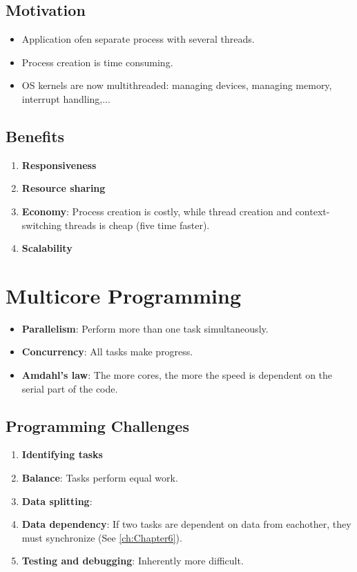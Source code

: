 \documentclass[10pt]{report}
\begin{document}
		\subsection{Motivation}
			\begin{itemize}
				\item Application ofen separate process with several threads.
				\item Process creation is time consuming.
				\item OS kernels are now multithreaded: managing devices, managing memory, interrupt handling,...
			\end{itemize}

		\subsection{Benefits}
			\begin{enumerate}
				\item \textbf{Responsiveness}
				\item \textbf{Resource sharing}
				\item \textbf{Economy}: Process creation is costly, while thread creation and context-switching threads is cheap (five time faster).
				\item \textbf{Scalability}
			\end{enumerate}

	\section{Multicore Programming}
		\begin{itemize}
			\item \textbf{Parallelism}: Perform more than one task simultaneously.
			\item \textbf{Concurrency}: All tasks make progress.
			\item \textbf{Amdahl's law}: The more cores, the more the speed is dependent on the serial part of the code.
		\end{itemize}

		\subsection{Programming Challenges}
			\begin{enumerate}
				\item \textbf{Identifying tasks}
				\item \textbf{Balance}: Tasks perform equal work.
				\item \textbf{Data splitting}:
				\item \textbf{Data dependency}: If two tasks are dependent on data from eachother, they must synchronize (See \autoref{ch:Chapter6}).
				\item \textbf{Testing and debugging}: Inherently more difficult.
			\end{enumerate}
\end{document}
